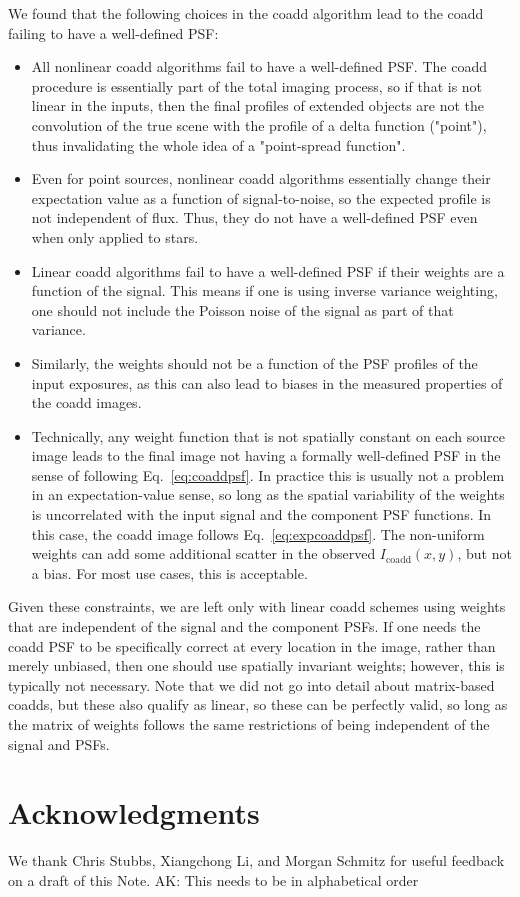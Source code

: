 \documentclass[modern]{style_and_logos/lsstdescnote}
\newcommand{\arun}[1]{{\color{blue}AK: #1}}
\begin{document}
We found that the following choices in the coadd algorithm lead to the coadd failing to
have a well-defined PSF:
\begin{itemize}
    \item All nonlinear coadd algorithms fail to have a well-defined PSF.  The coadd procedure is essentially part of the total imaging process, so if that is not linear in the inputs, then the final profiles of extended objects are not the convolution of the true scene with the profile of a delta function ("point"), thus invalidating the whole idea of a "point-spread function".
    \item Even for point sources, nonlinear coadd algorithms essentially change their expectation value as a function of signal-to-noise, so the expected profile is not independent of flux.  Thus, they do not have a well-defined PSF even when only applied to stars.
    \item Linear coadd algorithms fail to have a well-defined PSF if their weights are a function of the signal.  This means if one is using inverse variance weighting, one should not include the Poisson noise of the signal as part of that variance.
    \item Similarly, the weights should not be a function of the PSF profiles of the input exposures, as this can also lead to biases in the measured properties of the coadd images.
    \item Technically, any weight function that is not spatially constant on each source image leads to the final image not having a formally well-defined PSF in the sense of following Eq.~\eqref{eq:coaddpsf}.  In practice this is usually not a problem in an expectation-value sense, so long as the spatial variability of the weights is uncorrelated with the input signal and the component PSF functions.  In this case, the coadd image follows Eq.~\eqref{eq:expcoaddpsf}. The non-uniform weights can add some additional scatter in the observed $I_\mathrm{coadd}(x,y)$, but not a bias.  For most use cases, this is acceptable.
\end{itemize}

Given these constraints, we are left only with linear coadd schemes using weights that are independent of the signal and the component PSFs.  If one needs the coadd PSF to be specifically correct at every location in the image, rather than merely unbiased, then one should use spatially invariant weights; however, this is typically not necessary. Note that we did not go into detail about matrix-based coadds, but these also qualify as linear, so these can be perfectly valid, so long as the matrix of weights follows the same restrictions of being independent of the signal and PSFs.

\section*{Acknowledgments}

We thank Chris Stubbs, Xiangchong Li, and Morgan Schmitz for useful feedback on a draft of this Note.
\arun{This needs to be in alphabetical order}

  
\end{document}
